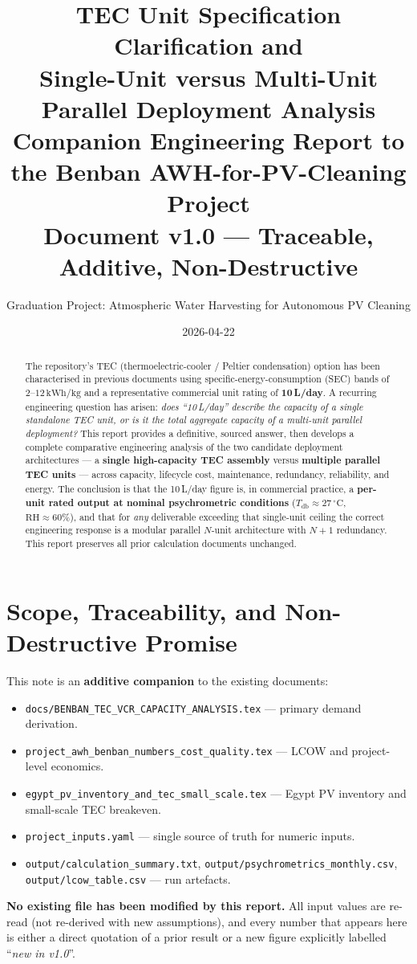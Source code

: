 \documentclass[11pt,a4paper]{article}
\title{\textbf{TEC Unit Specification Clarification and\\
Single-Unit versus Multi-Unit Parallel Deployment Analysis}\\
\large Companion Engineering Report to the Benban AWH-for-PV-Cleaning Project \\
\normalsize Document v1.0 --- Traceable, Additive, Non-Destructive}
\author{Graduation Project: Atmospheric Water Harvesting for Autonomous PV Cleaning}
\date{2026-04-22}
\begin{document}
\maketitle

\begin{abstract}
\noindent
The repository's TEC (thermoelectric-cooler / Peltier condensation) option has been characterised in previous documents using specific-energy-consumption (SEC) bands of $2$--$12\,\mathrm{kWh/kg}$ and a representative commercial unit rating of \textbf{10\,L/day}. A recurring engineering question has arisen: \emph{does ``10\,L/day'' describe the capacity of a single standalone TEC unit, or is it the total aggregate capacity of a multi-unit parallel deployment?} This report provides a definitive, sourced answer, then develops a complete comparative engineering analysis of the two candidate deployment architectures --- a \textbf{single high-capacity TEC assembly} versus \textbf{multiple parallel TEC units} --- across capacity, lifecycle cost, maintenance, redundancy, reliability, and energy. The conclusion is that the 10\,L/day figure is, in commercial practice, a \textbf{per-unit rated output at nominal psychrometric conditions} ($T_{\mathrm{db}}{\approx}27\,^{\circ}\mathrm{C}$, $\mathrm{RH}{\approx}60\%$), and that for \emph{any} deliverable exceeding that single-unit ceiling the correct engineering response is a modular parallel $N$-unit architecture with $N{+}1$ redundancy. This report preserves all prior calculation documents unchanged.
\end{abstract}

\tableofcontents
\bigskip

\section{Scope, Traceability, and Non-Destructive Promise}
\label{sec:scope}
This note is an \textbf{additive companion} to the existing documents:
\begin{itemize}[leftmargin=*]
  \item \texttt{docs/BENBAN\_TEC\_VCR\_CAPACITY\_ANALYSIS.tex} --- primary demand derivation.
  \item \texttt{project\_awh\_benban\_numbers\_cost\_quality.tex} --- LCOW and project-level economics.
  \item \texttt{egypt\_pv\_inventory\_and\_tec\_small\_scale.tex} --- Egypt PV inventory and small-scale TEC breakeven.
  \item \texttt{project\_inputs.yaml} --- single source of truth for numeric inputs.
  \item \texttt{output/calculation\_summary.txt}, \texttt{output/psychrometrics\_monthly.csv}, \texttt{output/lcow\_table.csv} --- run artefacts.
\end{itemize}
\textbf{No existing file has been modified by this report.} All input values are re-read (not re-derived with new assumptions), and every number that appears here is either a direct quotation of a prior result or a new figure explicitly labelled ``\emph{new in v1.0}''.
\end{document}
